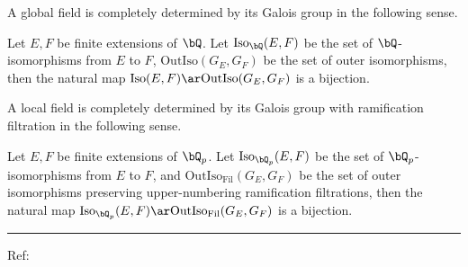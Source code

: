 \documentclass[0-main]{subfiles}
\begin{document}
\ifSubfilesClassLoaded{
	\tableofcontents
}{}







\cite{Mochizuki2021IUT1,Mochizuki2021IUT2,Mochizuki2021IUT3,Mochizuki2021IUT4}





A global field is completely determined by its Galois group in the following sense.

\begin{thm}
	Let $E,F$ be finite extensions of $\bQ$. Let $\mathrm{Iso}_{\bQ}(E,F)$ be the set of $\bQ$-isomorphisms from $E$ to $F$, $\mathrm{OutIso}(G_{E},G_{F})$ be the set of outer isomorphisms, then the natural map $\mathrm{Iso}(E,F)\ar \mathrm{OutIso}(G_{E},G_{F})$ is a bijection.
\end{thm}

A local field is completely determined by its Galois group with ramification filtration in the following sense.

\begin{thm}
	Let $E,F$ be finite extensions of $\bQ_{p}$. Let $\mathrm{Iso}_{\bQ_{p}}(E,F)$ be the set of $\bQ_{p}$-isomorphisms from $E$ to $F$, and $\mathrm{OutIso}_{\text{Fil}}(G_{E},G_{F})$ be the set of outer isomorphisms preserving upper-numbering ramification filtrations, then the natural map $\mathrm{Iso}_{\bQ_{p}}(E,F)\ar \mathrm{OutIso}_{\text{Fil}}(G_{E},G_{F})$ is a bijection.
\end{thm}

\hrule


Ref:~\cite{Mochizuki2008Frob1,Mochizuki2008Frob2}
\end{document}
